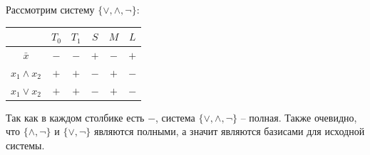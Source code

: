 \begin{example}
    Рассмотрим систему \(\{\lor, \land, \neg\}\):
    {
    \renewcommand*{\arraystretch}{1.5}
    \begin{longtable}{|c|c|c|c|c|c|}
        \hline
                          & \(T_0\) & \(T_1\) & \(S\) & \(M\) & \(L\) \\
        \hline
        \(\bar{x}\)       & \(-\)   & \(-\)   & \(+\) & \(-\) & \(+\) \\
        \hline
        \(x_1 \land x_2\) & \(+\)   & \(+\)   & \(-\) & \(+\) & \(-\) \\
        \hline
        \(x_1 \lor x_2\)  & \(+\)   & \(+\)   & \(-\) & \(+\) & \(-\) \\
        \hline
    \end{longtable}
    }
    Так как в каждом столбике есть \(-\), система \(\{\lor, \land, \neg\}\) -- полная. Также очевидно, что \(\{\land, \neg\}\) и \(\{\lor, \neg\}\) являются полными, а значит являются базисами для исходной системы.
\end{example}

